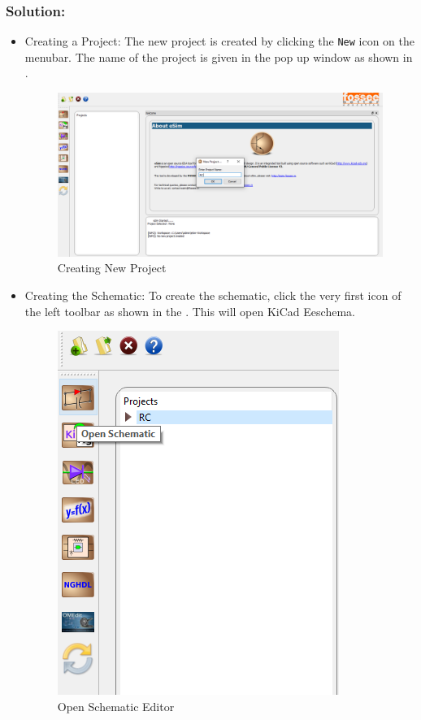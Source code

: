 \subsubsection{Solution:}
\begin{itemize}
\item Creating a Project:
The new project is created by clicking the {\tt New} icon on the menubar. The name of the project is given in the pop up window as shown in .
\begin{figure}[!htp]
    \centering
    \includegraphics[width=\hgfig]{figures/rc1.png}
    \caption{Creating New Project}
    \label{rc1}
\end{figure}

\item Creating the Schematic:
To create the schematic, click the very first icon of the left toolbar as shown in the . This will open KiCad Eeschema.

\begin{figure}[!htp]
    \centering
    \includegraphics[width=\smfigp]{figures/rc2.png}
    \caption{Open Schematic Editor}
    \label{rc2}
\end{figure}


\end{itemize}
